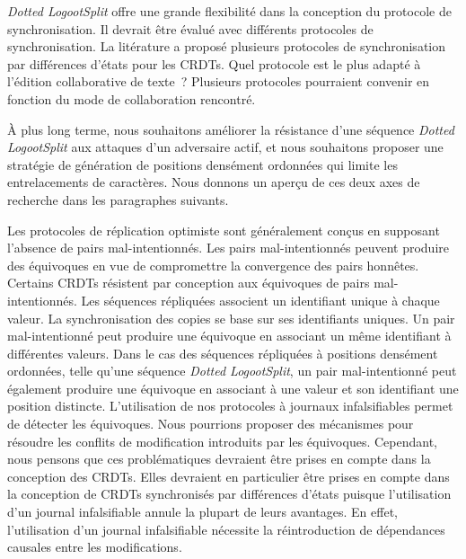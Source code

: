 \emph{Dotted LogootSplit} offre une grande flexibilité dans la conception du protocole de synchronisation.
Il devrait être évalué avec différents protocoles de synchronisation.
La litérature a proposé plusieurs protocoles de synchronisation par différences d'états pour les \acp{CRDT}.
Quel protocole est le plus adapté à l'édition collaborative de texte~?
Plusieurs protocoles pourraient convenir en fonction du mode de collaboration rencontré.

À plus long terme, nous souhaitons améliorer la résistance d'une séquence \emph{Dotted LogootSplit} aux attaques d'un adversaire actif, et nous souhaitons proposer une stratégie de génération de positions densément ordonnées qui limite les entrelacements de caractères.
Nous donnons un aperçu de ces deux axes de recherche dans les paragraphes suivants.

Les protocoles de réplication optimiste sont généralement conçus en supposant l'absence de pairs mal-intentionnés.
Les pairs mal-intentionnés peuvent produire des équivoques en vue de compromettre la convergence des pairs honnêtes.
Certains \acp{CRDT} résistent par conception aux équivoques de pairs mal-intentionnés.
Les séquences répliquées associent un identifiant unique à chaque valeur.
La synchronisation des copies se base sur ses identifiants uniques.
Un pair mal-intentionné peut produire une équivoque en associant un même identifiant à différentes valeurs.
Dans le cas des séquences répliquées à positions densément ordonnées, telle qu'une séquence \emph{Dotted LogootSplit}, un pair mal-intentionné peut également produire une équivoque en associant à une valeur et son identifiant une position distincte.
L'utilisation de nos protocoles à journaux infalsifiables permet de détecter les équivoques.
Nous pourrions proposer des mécanismes pour résoudre les conflits de modification introduits par les équivoques.
Cependant, nous pensons que ces problématiques devraient être prises en compte dans la conception des \acp{CRDT}.
Elles devraient en particulier être prises en compte dans la conception de \acp{CRDT} synchronisés par différences d'états puisque l'utilisation d'un journal infalsifiable annule la plupart de leurs avantages.
En effet, l'utilisation d'un journal infalsifiable nécessite la réintroduction de dépendances causales entre les modifications.

